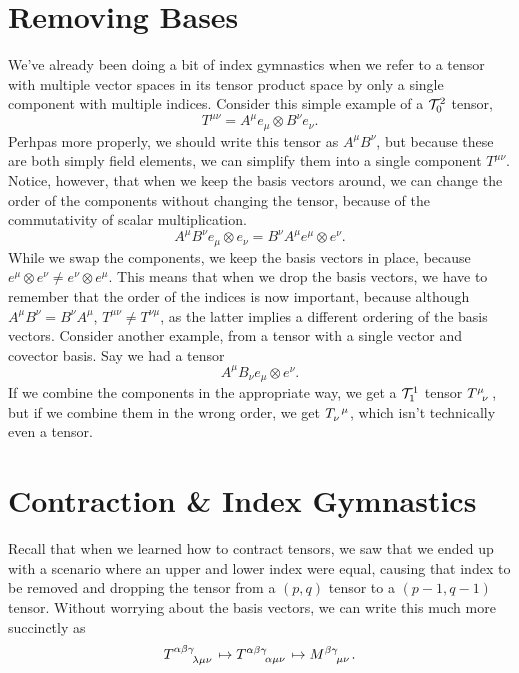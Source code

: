\section{Removing Bases}
We've already been doing a bit of index gymnastics when we refer to a tensor with multiple vector spaces in its tensor product space by only a single component with multiple indices.
Consider this simple example of a $\mathcal{T}^2_0$ tensor,
\[ T^{\mu\nu} = A^\mu e_\mu \otimes B^\nu e_\nu. \]
Perhpas more properly, we should write this tensor as $A^\mu B^\nu$, but because these are both simply field elements, we can simplify them into a single component $T^{\mu\nu}$.
Notice, however, that when we keep the basis vectors around, we can change the order of the components without changing the tensor, because of the commutativity of scalar multiplication.
\[ A^\mu B^\nu e_\mu \otimes e_\nu = B^\nu A^\mu e^\mu \otimes e^\nu. \]
While we swap the components, we keep the basis vectors in place, because $e^\mu \otimes e^\nu \not= e^\nu \otimes e^\mu$.
This means that when we drop the basis vectors, we have to remember that the order of the indices is now important, because although $A^\mu B^\nu = B^\nu A^\mu$, $T^{\mu\nu} \not= T^{\nu\mu}$, as the latter implies a different ordering of the basis vectors.
Consider another example, from a tensor with a single vector and covector basis.
Say we had a tensor
\[ A^\mu B_\nu e_\mu \otimes e^\nu. \]
If we combine the components in the appropriate way, we get a $\mathcal{T}^1_1$ tensor $\tensor{T}{^\mu_\nu}$, but if we combine them in the wrong order, we get $\tensor{T}{_\nu^\mu}$, which isn't technically even a tensor.

\section{Contraction \& Index Gymnastics}
Recall that when we learned how to contract tensors, we saw that we ended up with a scenario where an upper and lower index were equal, causing that index to be removed and dropping the tensor from a $(p,q)$ tensor to a $(p-1,q-1)$ tensor.
Without worrying about the basis vectors, we can write this much more succinctly as
\[ \tensor{T}{^{\alpha\beta\gamma}_{\lambda\mu\nu}} \mapsto \tensor{T}{^{\alpha\beta\gamma}_{\alpha\mu\nu}} \mapsto \tensor{M}{^{\beta\gamma}_{\mu\nu}}. \]

